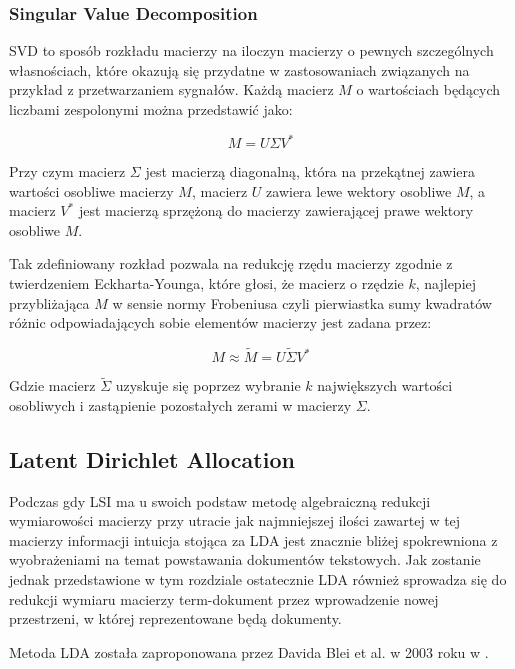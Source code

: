 \documentclass[11pt,a4paper]{article}
\begin{document}
\subsubsection{Singular Value Decomposition}

SVD to sposób rozkładu macierzy na iloczyn macierzy o pewnych szczególnych
własnościach, które okazują się przydatne w zastosowaniach związanych na
przykład z przetwarzaniem sygnałów. Każdą macierz $M$ o wartościach będących
liczbami zespolonymi można przedstawić jako:

\begin{equation}
  \label{svd}
  M = U\Sigma V^*
\end{equation}

Przy czym macierz $\Sigma$ jest macierzą diagonalną, która na przekątnej
zawiera wartości osobliwe macierzy $M$, macierz $U$ zawiera lewe wektory
osobliwe $M$, a macierz $V^*$ jest macierzą sprzężoną do macierzy zawierającej
prawe wektory osobliwe $M$.

Tak zdefiniowany rozkład pozwala na redukcję rzędu macierzy zgodnie z
twierdzeniem Eckharta-Younga, które głosi, że macierz o rzędzie $k$, najlepiej
przybliżająca $M$ w sensie normy Frobeniusa czyli pierwiastka sumy kwadratów
różnic odpowiadających sobie elementów macierzy jest zadana przez:

\begin{equation}
  M \approx \tilde{M} = U\tilde{\Sigma} V^*
\end{equation}

Gdzie macierz $\tilde{\Sigma}$ uzyskuje się poprzez wybranie $k$ największych
wartości osobliwych i zastąpienie pozostałych zerami w macierzy $\Sigma$.

\subsection{Latent Dirichlet Allocation}
\label{sec:lda}

Podczas gdy LSI ma u swoich podstaw metodę algebraiczną redukcji wymiarowości
macierzy przy utracie jak najmniejszej ilości zawartej w tej macierzy
informacji intuicja stojąca za LDA jest znacznie bliżej spokrewniona z
wyobrażeniami na temat powstawania dokumentów tekstowych. Jak zostanie jednak
przedstawione w tym rozdziale ostatecznie LDA również sprowadza się do redukcji
wymiaru macierzy term-dokument przez wprowadzenie nowej przestrzeni, w której
reprezentowane będą dokumenty.

Metoda LDA została zaproponowana przez Davida Blei et al. w 2003 roku w
\cite{lda-paper}.
\end{document}
